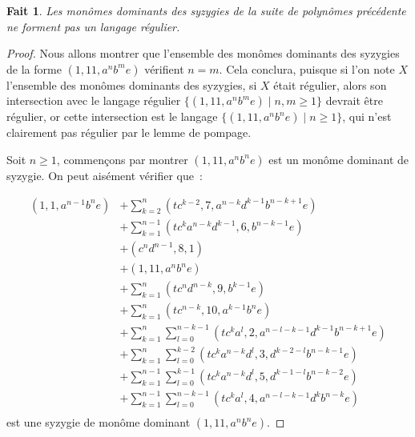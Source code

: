 \documentclass{article}
\newtheorem*{fact}{Fait}
\begin{document}
\begin{fact}
	Les monômes dominants des syzygies de la suite de polynômes précédente ne forment pas un langage régulier.
\end{fact}
\begin{proof}
Nous allons montrer que l'ensemble des monômes dominants des syzygies de la forme $(1, 11, a^nb^me)$ vérifient $n = m$. Cela conclura, puisque si l'on note $X$ l'ensemble des monômes dominants des syzygies, si $X$ était régulier, alors son intersection avec le langage régulier $\{(1, 11, a^nb^me) \;|\; n, m \geq 1\}$ devrait être régulier, or cette intersection est le langage $\{(1, 11, a^nb^ne) \;|\; n \geq 1 \}$, qui n'est clairement pas régulier par le lemme de pompage.

Soit $n \geq 1$, commençons par montrer $(1, 11, a^nb^ne)$ est un monôme dominant de syzygie.
On peut aisément vérifier que~:

\begin{align*}
(1, 1, a^{n-1}b^ne) & + \sum_{k = 2}^{n} (tc^{k - 2}, 7, a^{n - k}d^{k - 1}b^{n - k + 1}e) \\
& + \sum_{k = 1}^{n - 1} (tc^ka^{n - k}d^{k - 1}, 6, b^{n - k - 1}e) \\
& + (c^nd^{n - 1}, 8, 1) \\
& + (1, 11, a^nb^ne) \\
& + \sum_{k = 1}^n (tc^nd^{n - k}, 9, b^{k - 1}e) \\
& + \sum_{k = 1}^n (tc^{n - k}, 10, a^{k - 1}b^ne) \\
& + \sum_{k = 1}^{n} \sum_{l = 0}^{n - k - 1} (tc^{k}a^{l}, 2, a^{n - l - k - 1}d^{k - 1}b^{n - k + 1} e) \\
& + \sum_{k = 1}^{n} \sum_{l = 0}^{k - 2} (tc^{k}a^{n - k}d^l, 3, d^{k - 2 - l}b^{n - k - 1}e) \\
& + \sum_{k = 1}^{n - 1} \sum_{l = 0}^{k - 1} (tc^{k}a^{n - k}d^l, 5, d^{k - 1 - l}b^{n - k - 2}e) \\
& + \sum_{k = 1}^{n - 1} \sum_{l = 0}^{n - k - 1} (tc^{k}a^{l}, 4, a^{n - l - k - 1}d^{k}b^{n - k} e) \\
\end{align*}
est une syzygie de monôme dominant $(1, 11, a^nb^ne)$.


\end{proof}
\end{document}
